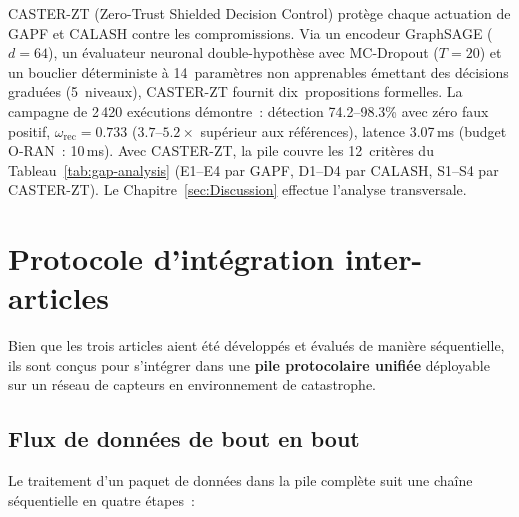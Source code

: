 CASTER-ZT (Zero-Trust Shielded Decision Control) protège chaque actuation de GAPF et CALASH contre les compromissions. Via un encodeur GraphSAGE ($d = 64$), un évaluateur neuronal double-hypothèse avec MC-Dropout ($T = 20$) et un bouclier déterministe à 14~paramètres non apprenables émettant des décisions graduées (5~niveaux), CASTER-ZT fournit dix~propositions formelles. La campagne de 2\,420 exécutions démontre~: détection 74.2--98.3\% avec zéro faux positif, $\omega_{\text{rec}} = 0.733$ ($3.7$--$5.2\times$ supérieur aux références), latence 3.07\,ms (budget O-RAN~: 10\,ms). Avec CASTER-ZT, la pile couvre les 12~critères du Tableau~\ref{tab:gap-analysis} (E1--E4 par GAPF, D1--D4 par CALASH, S1--S4 par CASTER-ZT). Le Chapitre~\ref{sec:Discussion} effectue l'analyse transversale.


\section{Protocole d'intégration inter-articles}\label{sec:demarche-integration}

Bien que les trois articles aient été développés et évalués de manière séquentielle, ils sont conçus pour s'intégrer dans une \textbf{pile protocolaire unifiée} déployable sur un réseau de capteurs en environnement de catastrophe.

\subsection{Flux de données de bout en bout}

Le traitement d'un paquet de données dans la pile complète suit une chaîne séquentielle en quatre étapes~:

